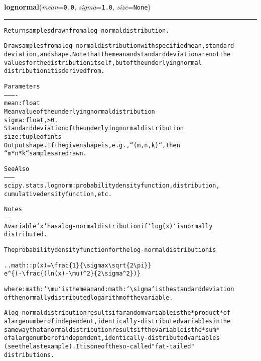 \hspace{.8\funcindent}\begin{boxedminipage}{\funcwidth}

    \raggedright \textbf{lognormal}(\textit{mean}={\tt 0.0}, \textit{sigma}={\tt 1.0}, \textit{size}={\tt None})

    \vspace{-1.5ex}

    \rule{\textwidth}{0.5\fboxrule}
\setlength{\parskip}{2ex}
\begin{alltt}
Return samples drawn from a log-normal distribution.

Draw samples from a log-normal distribution with specified mean, standard
deviation, and shape. Note that the mean and standard deviation are not the
values for the distribution itself, but of the underlying normal
distribution it is derived from.


Parameters
----------
mean : float
    Mean value of the underlying normal distribution
sigma : float, {\textgreater}0.
    Standard deviation of the underlying normal distribution
size : tuple of ints
    Output shape.  If the given shape is, e.g., ``(m, n, k)``, then
    ``m * n * k`` samples are drawn.

See Also
--------
scipy.stats.lognorm : probability density function, distribution,
    cumulative density function, etc.

Notes
-----
A variable `x` has a log-normal distribution if `log(x)` is normally
distributed.

The probability density function for the log-normal distribution is

.. math:: p(x) = {\textbackslash}frac\{1\}\{{\textbackslash}sigma x {\textbackslash}sqrt\{2{\textbackslash}pi\}\}
                 e{\textasciicircum}\{(-{\textbackslash}frac\{(ln(x)-{\textbackslash}mu){\textasciicircum}2\}\{2{\textbackslash}sigma{\textasciicircum}2\})\}

where :math:`{\textbackslash}mu` is the mean and :math:`{\textbackslash}sigma` is the standard deviation
of the normally distributed logarithm of the variable.

A log-normal distribution results if a random variable is the *product* of
a large number of independent, identically-distributed variables in the
same way that a normal distribution results if the variable is the *sum*
of a large number of independent, identically-distributed variables
(see the last example). It is one of the so-called "fat-tailed"
distributions.


\end{alltt}
\end{boxedminipage}
